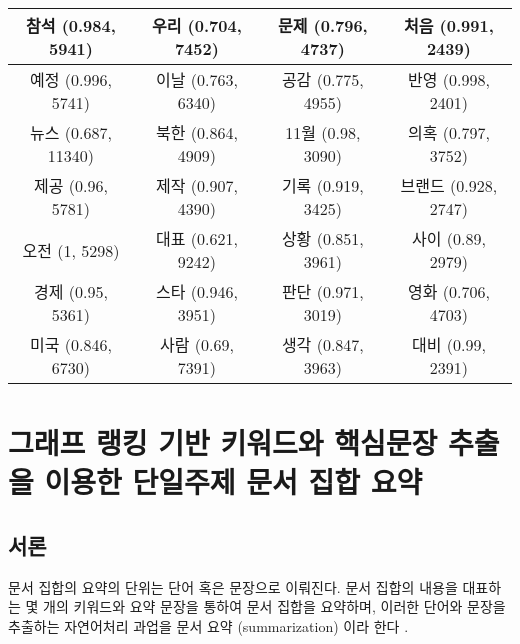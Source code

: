 \documentclass[oneside, ko,phd]{snuthesis_utf8_kor}
\begin{document}
\begin{table}[H]
{\begin{tabular}{|c|c|c|c|}
참석 (0.984, 5941) & 우리 (0.704, 7452) & 문제 (0.796, 4737) & 처음 (0.991, 2439) \\ \hline
예정 (0.996, 5741) & 이날 (0.763, 6340) & 공감 (0.775, 4955) & 반영 (0.998, 2401) \\ \hline
뉴스 (0.687, 11340) & 북한 (0.864, 4909) & 11월 (0.98, 3090) & 의혹 (0.797, 3752) \\ \hline
제공 (0.96, 5781) & 제작 (0.907, 4390) & 기록 (0.919, 3425) & 브랜드 (0.928, 2747) \\ \hline
오전 (1, 5298) & 대표 (0.621, 9242) & 상황 (0.851, 3961) & 사이 (0.89, 2979) \\ \hline
경제 (0.95, 5361) & 스타 (0.946, 3951) & 판단 (0.971, 3019) & 영화 (0.706, 4703) \\ \hline
미국 (0.846, 6730) & 사람 (0.69, 7391) & 생각 (0.847, 3963) & 대비 (0.99, 2391) \\ \hline
\end{tabular}%
}
\end{table}

\newpage
\chapter{그래프 랭킹 기반 키워드와 핵심문장 추출을 이용한 단일주제 문서 집합 요약} \label{summarize_single_topic}

\section{서론}

문서 집합의 요약의 단위는 단어 혹은 문장으로 이뤄진다.
문서 집합의 내용을 대표하는 몇 개의 키워드와 요약 문장을 통하여 문서 집합을 요약하며, 이러한 단어와 문장을 추출하는 자연어처리 과업을 문서 요약 (summarization) 이라 한다 \cite{yao2017recent}.
\end{document}
